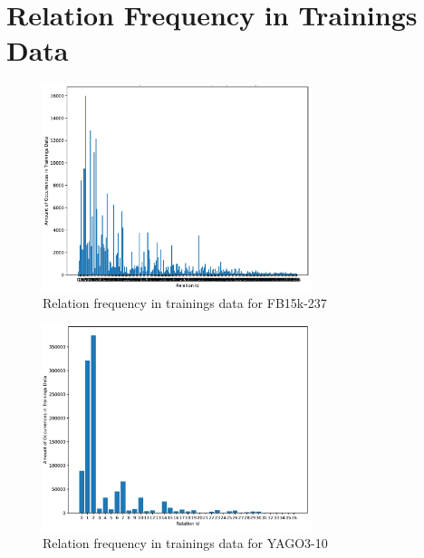 \section{Relation Frequency in Trainings Data}
\label{appendix:relation_freq}

\begin{figure}[H]
\centering
\includegraphics[width=0.7\textwidth]{images/relation_freq_fb15k.PNG}
\caption{Relation frequency in trainings data for FB15k-237}
\label{fig:relation_freq_fb15k}
\end{figure}

\begin{figure}[H]
\centering
\includegraphics[width=0.7\textwidth]{images/relation_freq_yago.PNG}
\caption{Relation frequency in trainings data for YAGO3-10}
\label{fig:relation_freq_yago}
\end{figure}